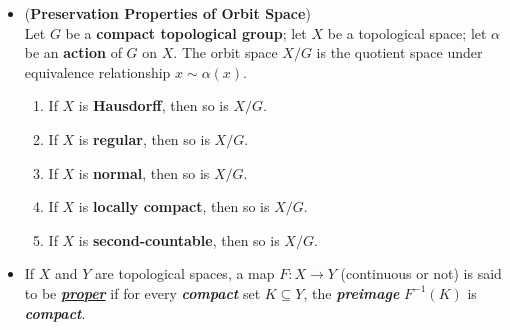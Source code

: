 \documentclass[11pt]{article}
\begin{document}
\begin{itemize}
\item \begin{theorem} (\textbf{Preservation Properties of Orbit Space}) \citep{munkres2000topology}\\
Let $G$ be a \textbf{compact topological group}; let $X$ be a topological space; let $\alpha$ be an \textbf{action} of $G$ on $X$. The orbit space $X/G$ is the quotient space under equivalence relationship $x \sim \alpha(x)$. 
\begin{enumerate}
\item If $X$ is \textbf{Hausdorff}, then so is $X/G$.
\item If $X$ is \textbf{regular}, then so is $X/G$.
\item If $X$ is \textbf{normal}, then so is $X/G$.
\item If $X$ is \textbf{locally compact}, then so is $X/G$.
\item If $X$ is \textbf{second-countable}, then so is $X/G$.
\end{enumerate}
\end{theorem}


\item \begin{definition}
If $X$ and $Y$ are topological spaces, a map $F: X \rightarrow Y$ (continuous or not) is said to be \underline{\emph{\textbf{proper}}} if for every \textbf{\emph{compact}} set $K \subseteq Y$, the \emph{\textbf{preimage}} $F^{-1}(K)$ is \emph{\textbf{compact}}.
\end{definition}
\end{itemize}
\end{document}
